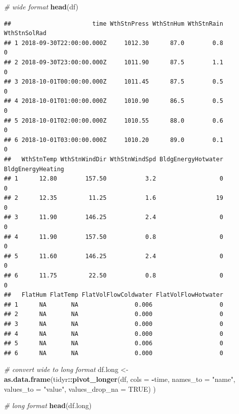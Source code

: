 \documentclass[
]{book}
\newenvironment{Shaded}{\begin{snugshade}}{\end{snugshade}}
\newcommand{\CommentTok}[1]{\textcolor[rgb]{0.56,0.35,0.01}{\textit{#1}}}
\newcommand{\DataTypeTok}[1]{\textcolor[rgb]{0.13,0.29,0.53}{#1}}
\newcommand{\KeywordTok}[1]{\textcolor[rgb]{0.13,0.29,0.53}{\textbf{#1}}}
\newcommand{\NormalTok}[1]{#1}
\newcommand{\OperatorTok}[1]{\textcolor[rgb]{0.81,0.36,0.00}{\textbf{#1}}}
\newcommand{\OtherTok}[1]{\textcolor[rgb]{0.56,0.35,0.01}{#1}}
\newcommand{\StringTok}[1]{\textcolor[rgb]{0.31,0.60,0.02}{#1}}
\begin{document}
\begin{Shaded}
\begin{Highlighting}[]
\CommentTok{# wide format}
\KeywordTok{head}\NormalTok{(df)}
\end{Highlighting}
\end{Shaded}

\begin{verbatim}
##                       time WthStnPress WthStnHum WthStnRain WthStnSolRad
## 1 2018-09-30T22:00:00.000Z     1012.30      87.0        0.8            0
## 2 2018-09-30T23:00:00.000Z     1011.90      87.5        1.1            0
## 3 2018-10-01T00:00:00.000Z     1011.45      87.5        0.5            0
## 4 2018-10-01T01:00:00.000Z     1010.90      86.5        0.5            0
## 5 2018-10-01T02:00:00.000Z     1010.55      88.0        0.6            0
## 6 2018-10-01T03:00:00.000Z     1010.20      89.0        0.1            0
##   WthStnTemp WthStnWindDir WthStnWindSpd BldgEnergyHotwater BldgEnergyHeating
## 1      12.80        157.50           3.2                  0                 0
## 2      12.35         11.25           1.6                 19                 0
## 3      11.90        146.25           2.4                  0                 0
## 4      11.90        157.50           0.8                  0                 0
## 5      11.60        146.25           2.4                  0                 0
## 6      11.75         22.50           0.8                  0                 0
##   FlatHum FlatTemp FlatVolFlowColdwater FlatVolFlowHotwater
## 1      NA       NA                0.006                   0
## 2      NA       NA                0.000                   0
## 3      NA       NA                0.000                   0
## 4      NA       NA                0.000                   0
## 5      NA       NA                0.006                   0
## 6      NA       NA                0.000                   0
\end{verbatim}

\begin{Shaded}
\begin{Highlighting}[]
\CommentTok{# convert wide to long format}
\NormalTok{df.long <-}\StringTok{ }\KeywordTok{as.data.frame}\NormalTok{(tidyr}\OperatorTok{::}\KeywordTok{pivot_longer}\NormalTok{(df,}
                                      \DataTypeTok{cols =} \OperatorTok{-}\NormalTok{time,}
                                      \DataTypeTok{names_to =} \StringTok{"name"}\NormalTok{,}
                                      \DataTypeTok{values_to =} \StringTok{"value"}\NormalTok{,}
                                      \DataTypeTok{values_drop_na =} \OtherTok{TRUE}\NormalTok{)}
\NormalTok{                         )}

\CommentTok{# long format}
\KeywordTok{head}\NormalTok{(df.long)}
\end{Highlighting}
\end{Shaded}
\end{document}
